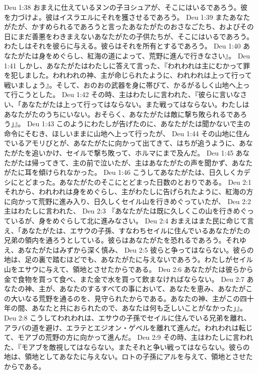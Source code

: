 Deu 1:38  おまえに仕えているヌンの子ヨシュアが、そこにはいるであろう。彼を力づけよ。彼はイスラエルにそれを獲させるであろう。
Deu 1:39  またあなたがたが、かすめられるであろうと言ったあなたがたのおさなごたち、およびその日にまだ善悪をわきまえないあなたがたの子供たちが、そこにはいるであろう。わたしはそれを彼らに与える。彼らはそれを所有とするであろう。
Deu 1:40  あなたがたは身をめぐらし、紅海の道によって、荒野に進んで行きなさい』。
Deu 1:41  しかし、あなたがたはわたしに答えて言った、『われわれは主にむかって罪を犯しました。われわれの神、主が命じられたように、われわれは上って行って戦いましょう』。そして、おのおの武器を身に帯びて、かるがるしく山地へ上って行こうとした。
Deu 1:42  その時、主はわたしに言われた、『彼らに言いなさい、「あなたがたは上って行ってはならない。また戦ってはならない。わたしはあなたがたのうちにいない。おそらく、あなたがたは敵に撃ち敗られるであろう」』。
Deu 1:43  このようにわたしが告げたのに、あなたがたは聞かないで主の命令にそむき、ほしいままに山地へ上って行ったが、
Deu 1:44  その山地に住んでいるアモリびとが、あなたがたに向かって出てきて、はちが追うように、あなたがたを追いかけ、セイルで撃ち敗って、ホルマにまで及んだ。
Deu 1:45  あなたがたは帰ってきて、主の前で泣いたが、主はあなたがたの声を聞かず、あなたがたに耳を傾けられなかった。
Deu 1:46  こうしてあなたがたは、日久しくカデシにとどまった。あなたがたのそこにとどまった日数のとおりである。
Deu 2:1  それから、われわれは身をめぐらし、主がわたしに告げられたように、紅海の方に向かって荒野に進み入り、日久しくセイル山を行きめぐっていたが、
Deu 2:2  主はわたしに言われた、
Deu 2:3  『あなたがたは既に久しくこの山を行きめぐっているが、身をめぐらして北に進みなさい。
Deu 2:4  おまえはまた民に命じて言え、「あなたがたは、エサウの子孫、すなわちセイルに住んでいるあなたがたの兄弟の領内を通ろうとしている。彼らはあなたがたを恐れるであろう。それゆえ、あなたがたはみずから深く慎み、
Deu 2:5  彼らと争ってはならない。彼らの地は、足の裏で踏むほどでも、あなたがたに与えないであろう。わたしがセイル山をエサウに与えて、領地とさせたからである。
Deu 2:6  あなたがたは彼らから金で食物を買って食べ、また金で水を買って飲まなければならない。
Deu 2:7  あなたの神、主が、あなたのするすべての事において、あなたを恵み、あなたがこの大いなる荒野を通るのを、見守られたからである。あなたの神、主がこの四十年の間、あなたと共におられたので、あなたは何も乏しいことがなかった」』。
Deu 2:8  こうしてわれわれは、エサウの子孫でセイルに住んでいる兄弟を離れ、アラバの道を避け、エラテとエジオン・ゲベルを離れて進んだ。われわれは転じて、モアブの荒野の方に向かって進んだ。
Deu 2:9  その時、主はわたしに言われた、『モアブを敵視してはならない。またそれと争い戦ってはならない。彼らの地は、領地としてあなたに与えない。ロトの子孫にアルを与えて、領地とさせたからである。
